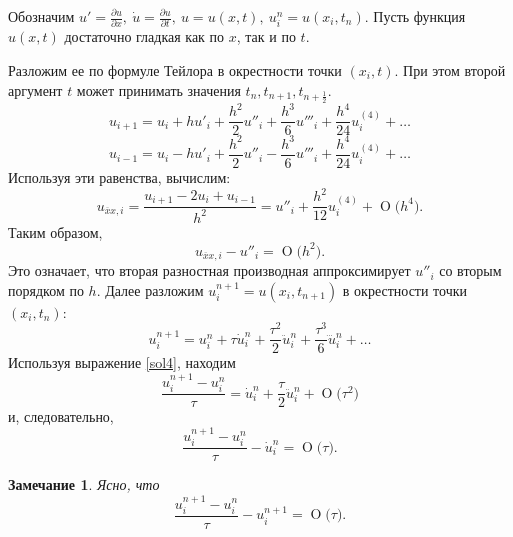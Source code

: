 \documentclass[11pt,a4paper,twoside,listtotoc,bibtotoc]{report}
\numberwithin{equation}{section}
\theoremstyle{definition}
\theoremstyle{plain}
\newtheorem*{note*}{Замечание}
\newcommand{\bigO}[1]{\ensuremath{\operatorname{O}\bigl(#1\bigr)}}
\begin{document}
%
\begin{solution}
%
    Обозначим
    $u'=\frac{\partial u}{\partial x},
    ~\dot u = \frac{\partial u}{\partial t},
    ~u = u(x,t), ~u^n_i=u(x_i, t_n).$
    Пусть функция $u(x,t)$ достаточно гладкая как по $x$, так и по $t$.

    Разложим ее по формуле Тейлора в окрестности точки $(x_i,t)$. При этом второй
    аргумент $t$ может принимать значения $t_n, t_{n+1}, t_{n+\frac12}$.
    \begin{equation}
        \label{sol1}
        u_{i+1} = u_i + hu'_i + \dfrac{h^2}{2}u''_{i} +
        \dfrac{h^3}{6} u'''_{i} + \dfrac{h^4}{24} u^{(4)}_{i} + \ldots
    \end{equation}
    \begin{equation}
        \label{sol2}
        u_{i-1} = u_i - hu'_i + \dfrac{h^2}{2}u''_{i} -
        \dfrac{h^3}{6} u'''_{i} + \dfrac{h^4}{24} u^{(4)}_{i} + \ldots
    \end{equation}
    Используя эти равенства, вычислим:
    \begin{equation}
        \label{sol3}
        u_{\overline{x}x,i} = \frac{u_{i+1}-2u_i+u_{i-1}}{h^2} =
        u''_i + \frac{h^2}{12}u^{(4)}_{i} + \bigO{h^4}.
    \end{equation}
    Таким образом,
    $$
        u_{\overline{x}x,i} - u''_i = \bigO{h^2}.
    $$
    Это означает, что вторая разностная производная аппроксимирует $u''_i$
    со вторым порядком по $h$.
    Далее разложим $u^{n+1}_i = u(x_i, t_{n+1})$ в окрестности точки $(x_i, t_n)$:
    \begin{equation}
        \label{sol4}
        u^{n+1}_i = u^n_i + \tau \dot u^n_i + \frac{\tau^2}{2} \ddot u^n_i +
        \frac{\tau^3}{6} \dddot u^n_i + \ldots
    \end{equation}
    Используя выражение \eqref{sol4}, находим
    $$
        \frac{u^{n+1}_{i}-u^n_i}{\tau} = \dot u^n_i +
        \frac{\tau}{2} \ddot u^n_i + \bigO{\tau^2}
    $$
    и, следовательно,
    \begin{equation}
        \label{sol5}
        \frac{u^{n+1}_{i}-u^n_i}{\tau} - \dot u^n_i = \bigO{\tau}.
    \end{equation}
    \begin{note*}
        Ясно, что
        \begin{equation}
            \label{sol6}
            \frac{u^{n+1}_{i}-u^n_i}{\tau} - u^{n+1}_i = \bigO{\tau}.
        \end{equation}
    \end{note*}


\end{solution}
\end{document}
